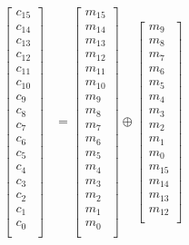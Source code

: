 \documentclass[12pt]{article}
\newcommand{\xor}{\ensuremath{\oplus}}
\begin{document}
\begin{align*}
\begin{bmatrix}
c_{15} \\
c_{14} \\
c_{13} \\
c_{12} \\
c_{11} \\
c_{10} \\
c_{9} \\
c_{8} \\
c_{7} \\
c_{6} \\
c_{5} \\
c_{4} \\
c_{3} \\
c_{2} \\
c_{1} \\
c_{0} \\
\end{bmatrix} &=
\begin{bmatrix}
m_{15} \\
m_{14} \\
m_{13} \\
m_{12} \\
m_{11} \\
m_{10} \\
m_{9} \\
m_{8} \\
m_{7} \\
m_{6} \\
m_{5} \\
m_{4} \\
m_{3} \\
m_{2} \\
m_{1} \\
m_{0} \\ 
\end{bmatrix} \xor
\begin{bmatrix}
m_{9} \\
m_{8} \\
m_{7} \\
m_{6} \\
m_{5} \\
m_{4} \\
m_{3} \\
m_{2} \\
m_{1} \\
m_{0} \\
m_{15} \\
m_{14} \\
m_{13} \\
m_{12} \\

\end{bmatrix}
\end{align*}
\end{document}
